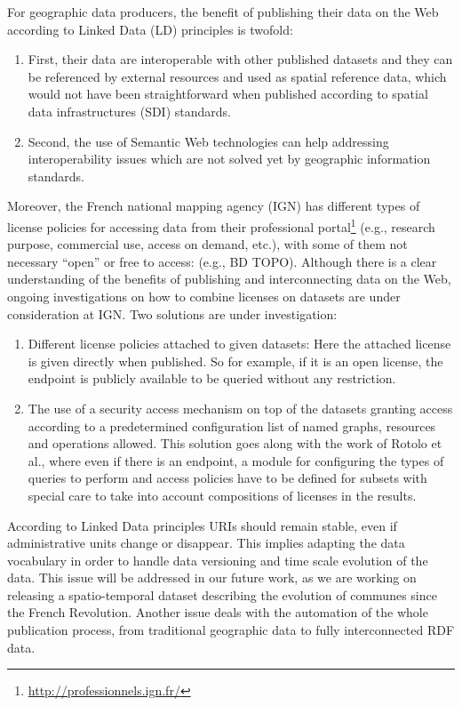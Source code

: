 \documentclass[a4paper,11pt,twoside]{report}
\begin{document}
For geographic data producers, the benefit of publishing their data on the Web according to Linked Data  (LD) principles is twofold:
\begin{enumerate}
\item First, their data are interoperable with other published datasets and they can be referenced by external resources and used as spatial reference data, which would not have been straightforward when published according to spatial data infrastructures (SDI) standards.
\item Second, the use of Semantic Web technologies can help addressing interoperability issues which are not solved yet by geographic information standards. 
\end{enumerate}
 
Moreover, the French national mapping agency (IGN) has different types of license policies for accessing data from their professional portal\footnote{\url{http://professionnels.ign.fr/}}  (e.g., research purpose, commercial use, access on demand, etc.), with some of them not necessary ``open'' or free to access: (e.g., BD TOPO\circledR). Although there is a clear understanding of the benefits of publishing and interconnecting data on the Web, ongoing investigations on how to combine licenses on datasets are under consideration at IGN. Two solutions are under investigation: 
\begin{enumerate}
\item Different license policies attached to given datasets: Here the attached license is given directly when published. So for example, if it is an open license, the endpoint is publicly available to be queried without any restriction.
\item The use of a security access mechanism on top of the datasets granting access according to a predetermined configuration list of named graphs, resources and operations allowed. This solution goes along with the work of Rotolo et al.\cite{rotolo2013deontic}, where even if there is an endpoint, a module for configuring the types of queries to perform and access policies have to be defined for subsets with special care to take into account compositions of licenses in the results.
\end{enumerate}
According to Linked Data principles URIs should remain stable, even if administrative units change or disappear. This implies adapting the data vocabulary in order to handle data versioning and time scale evolution of the data. This issue will be addressed in our future work, as we are working on releasing a spatio-temporal dataset describing the evolution of communes since the French Revolution. Another issue deals with the automation of the whole publication process, from traditional geographic data to fully interconnected RDF data.
\end{document}
